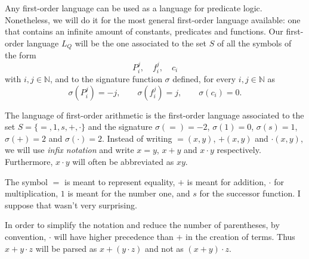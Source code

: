 \begin{example}
\label{lfo}
\begin{parlist}
\item \label{lq} Any first-order language can be used as a language for predicate logic. Nonetheless, we will do it for the most general first-order language available: one that contains an infinite amount of constants, predicates and functions. Our first-order language $L_Q$ will be the one associated to the set $S$ of all the symbols of the form
\[P_i^j,\quad f_i^j,\quad c_i\]
with $i,j\in\mathbb{N}$, and to the signature function $\sigma$ defined, for every $i,j\in\mathbb{N}$ as
\[\sigma\left(P_i^j\right) = -j,\qquad\sigma\left(f_i^j\right) = j,\qquad\sigma\left(c_i\right) = 0.\]

\item \label{lpa} The language of first-order arithmetic is the first-order language associated to the set $S = \{=,1,s,+,\cdot\}$ and the signature $\sigma(=)=-2$, $\sigma(1) = 0$, $\sigma(s) = 1$, $\sigma(+) = 2$ and $\sigma(\cdot) = 2$. Instead of writing $=\!(x,y)$, $+(x,y)$ and $\cdot(x,y)$, we will use \emph{infix notation} and write $x=y$, $x+y$ and $x\cdot y$ respectively.
Furthermore, $x\cdot y$ will often be abbreviated as $xy$.

The symbol $=$ is meant to represent equality, $+$ is meant for addition, $\cdot$ for multiplication, $1$ is meant for the number one, and $s$ for the successor function.
I suppose that wasn't very surprising.

In order to simplify the notation and reduce the number of parentheses, by convention, $\cdot$ will have higher precedence than $+$ in the creation of terms. Thus $x + y \cdot  z$ will be parsed as $x + ( y \cdot z) $ and not as $(x + y ) \cdot z$.
\end{parlist}
\end{example}

